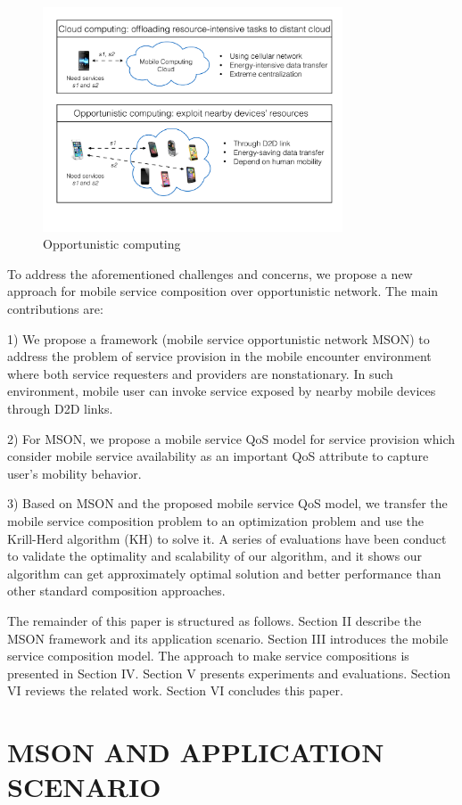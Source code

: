 \documentclass[10pt,journal,compsoc]{IEEEtran}
\begin{document}
\begin{figure}[!t]
\centering
\includegraphics[width=3.5in]{./img/pic1.pdf}
\caption{Opportunistic computing}
\label{fig_opportunistic}
\end{figure}

To address the aforementioned challenges and concerns, we propose a new approach for mobile service composition over opportunistic network. The main contributions are:

1) We propose a framework (mobile service opportunistic network MSON) to address the problem of service provision in the mobile encounter environment where both service requesters and providers are nonstationary. In such environment, mobile user can invoke service exposed by nearby mobile devices through D2D links.

2) For MSON, we propose a mobile service QoS model for service provision which consider mobile service availability as an important QoS attribute to capture user's mobility behavior.

3) Based on MSON and the proposed mobile service QoS model, we transfer the mobile service composition problem to an optimization problem and use the Krill-Herd algorithm (KH) to solve it. A series of evaluations have been conduct to validate the optimality and scalability of our algorithm, and it shows our algorithm can get approximately optimal solution and better performance than other standard composition approaches. 

The remainder of this paper is structured as follows. Section II describe the MSON framework and its application scenario. Section III introduces the mobile service composition model. The approach to make service compositions is presented in Section IV. Section V presents experiments and evaluations. Section VI reviews the related work. Section VI concludes this paper.

\section{MSON AND APPLICATION SCENARIO}
\end{document}
